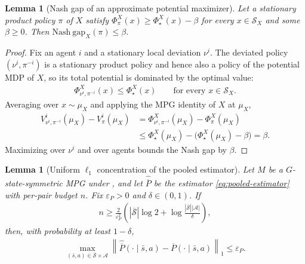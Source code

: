 \documentclass{article}
\theoremstyle{plain}
\newtheorem{lemma}[theorem]{Lemma}
\theoremstyle{definition}
\theoremstyle{remark}
\newcommand{\Nash}{\mathrm{Nash\ gap}}
\newcommand{\St}{\mathcal{S}}
\newcommand{\Ac}{\mathcal{A}}
\newcommand{\abs}[1]{\left\lvert#1\right\rvert}
\newcommand{\norm}[1]{\left\lVert#1\right\rVert}
\newcommand{\quotient}[1]{\overline{#1}}
\newcommand{\hatP}{\widehat{\quotient P}}
\begin{document}
\begin{lemma}[Nash gap of an approximate potential maximizer]
\label{lemma:potential-nash-gap}
Let a stationary product policy $\pi$ of $X$ satisfy
$\Phi^X_\pi(x)\ge\Phi^X_\star(x)-\beta$ for every $x\in\mathcal S_X$ and some
$\beta\ge0$. Then $\Nash_X(\pi)\le\beta$.
\end{lemma}

\begin{proof}
Fix an agent $i$ and a stationary local deviation $\nu^i$. The deviated
policy $(\nu^i,\pi^{-i})$ is a stationary product policy and hence also a
policy of the potential MDP of $X$, so its total potential is dominated by the
optimal value:
\begin{align*}
  \Phi^X_{\nu^i,\pi^{-i}}(x)
  \le
  \Phi^X_\star(x)
  \qquad
  \text{for every $x\in\mathcal S_X$.}
\end{align*}
Averaging over $x\sim\mu_X$ and applying the MPG identity of $X$ at $\mu_X$,
\begin{align*}
  V^i_{\nu^i,\pi^{-i}}(\mu_X)
  -
  V^i_\pi(\mu_X)
  &=
  \Phi^X_{\nu^i,\pi^{-i}}(\mu_X)
  -
  \Phi^X_\pi(\mu_X)\\
  &\le
  \Phi^X_\star(\mu_X)
  -
  \big(\Phi^X_\star(\mu_X)-\beta\big)
  =
  \beta.
\end{align*}
Maximizing over $\nu^i$ and over agents bounds the Nash gap by $\beta$.
\end{proof}

\begin{lemma}[Uniform $\ell_1$ concentration of the pooled estimator]
\label{lemma:l1-concentration}
Let $M$ be a $G$-state-symmetric MPG under
, and let $\hatP$ be the
estimator \eqref{eq:pooled-estimator} with per-pair budget $n$. Fix
$\varepsilon_P>0$ and $\delta\in(0,1)$. If
\begin{align*}
  n
  \ge
  \frac{2}{\varepsilon_P^2}
  \left(
    \abs{\quotient\St}\log2
    +\log\frac{\abs{\quotient\St}\abs\Ac}{\delta}
  \right),
\end{align*}
then, with probability at least $1-\delta$,
\begin{align}
  \max_{(\bar s,a)\in\quotient\St\times\Ac}
  \norm{\hatP(\cdot\mid\bar s,a)-\quotient P(\cdot\mid\bar s,a)}_1
  \le\varepsilon_P.
  \label{eq:l1-event}
\end{align}
\end{lemma}
\end{document}
